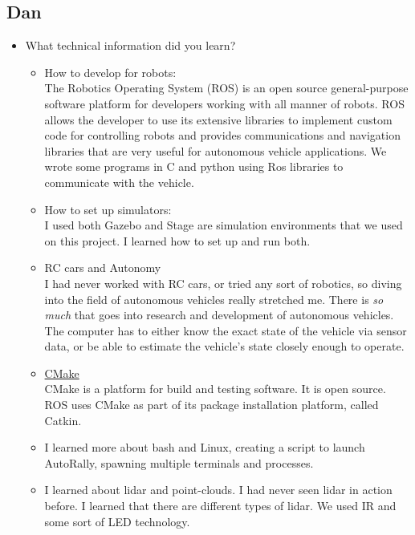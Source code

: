 \documentclass[compsoc,draftclsnofoot,onecolumn,10pt]{IEEEtran}
\begin{document}
\subsection{Dan}
\begin{itemize}

    \item What technical information did you learn?
    \begin{itemize}
        \item How to develop for robots:\\
        The Robotics Operating System (ROS) is an open source general-purpose software
        platform for developers working with all manner of robots. ROS allows the developer to
        use its extensive libraries to implement custom code for controlling robots and provides communications and navigation libraries that are very useful for autonomous vehicle applications. We wrote some programs in C and python using Ros libraries to communicate with the vehicle.
        \item How to set up simulators:\\
        I used both Gazebo and Stage are simulation environments that we used on this project. I learned how to set up and run both.
        \item RC cars and Autonomy\\
        I had never worked with RC cars, or tried any sort of robotics, so diving into the field of autonomous vehicles really stretched me. There is \textit{so much} that goes into research and development of autonomous vehicles. The computer has to either know the exact state of the vehicle via sensor data, or be able to estimate the vehicle's state closely enough to operate.
        \item \href{https:\\cmake.org}{CMake}\\
        CMake is a platform for build and testing software. It is open source. ROS uses CMake as part of its package installation platform, called Catkin.
        \item I learned more about bash and Linux, creating a script to launch AutoRally, spawning multiple terminals and processes.
        \item I learned about lidar and point-clouds. I had never seen lidar in action before. I learned that there are different types of lidar. We used IR and some sort of LED technology.
    \end{itemize}


\end{itemize}
\end{document}
